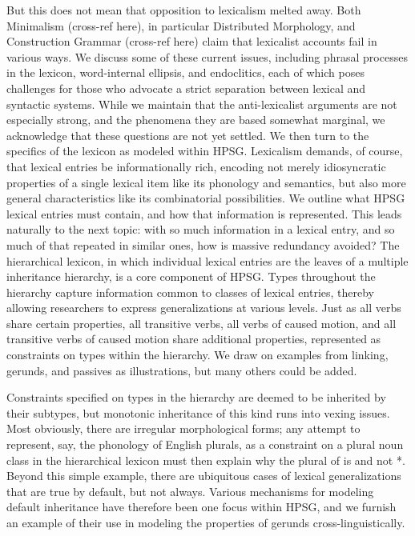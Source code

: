 \documentclass[output=paper]{langsci/langscibook}
\begin{document}
But this does not mean that opposition to lexicalism melted away.  Both Minimalism (cross-ref here), in particular Distributed Morphology, and Construction Grammar (cross-ref here) claim that lexicalist accounts fail in various ways.  We discuss some of these current issues, including phrasal processes in the lexicon, word-internal ellipsis, and endoclitics, each of which poses challenges for those who advocate a strict separation between lexical and syntactic systems.  While we maintain that the anti-lexicalist arguments are not especially strong, and the phenomena they are based somewhat marginal, we acknowledge that these questions are not yet settled. We then turn to the specifics of the lexicon as modeled within HPSG.  Lexicalism demands, of course, that lexical entries be informationally rich, encoding not merely idiosyncratic properties of a single lexical item like its phonology and semantics, but also more general characteristics like its combinatorial possibilities.  We outline what HPSG lexical entries must contain, and how that information is represented.  This leads naturally to the next topic: with so much information in a lexical entry, and so much of that repeated in similar ones, how is massive redundancy avoided?  The hierarchical lexicon, in which individual lexical entries are the leaves of a multiple inheritance hierarchy, is a core component of HPSG.  Types throughout the hierarchy capture information common to classes of lexical entries, thereby allowing researchers to express generalizations at various levels.  Just as all verbs share certain properties, all transitive verbs, all verbs of caused motion, and all transitive verbs of caused motion share additional properties, represented as constraints on types within the hierarchy.  We draw on examples from linking, gerunds, and passives as illustrations, but many others could be added.

Constraints specified on types in the hierarchy are deemed to be inherited by their subtypes, but monotonic inheritance of this kind runs into vexing issues.  Most obviously, there are irregular morphological forms; any attempt to represent, say, the phonology of English plurals, as a constraint on a plural noun class in the hierarchical lexicon must then explain why the plural of  is  and not *.  Beyond this simple example, there are ubiquitous cases of lexical generalizations that are true by default, but not always.  Various mechanisms for modeling default inheritance have therefore been one focus within HPSG, and we furnish an example of their use in modeling the properties of gerunds cross-linguistically.
\end{document}
